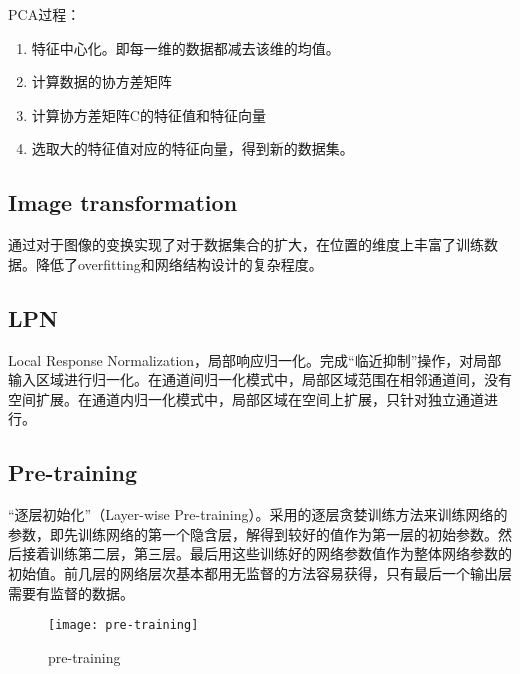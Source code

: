 PCA过程：
\begin{enumerate}
\item 特征中心化。即每一维的数据都减去该维的均值。
\item 计算数据的协方差矩阵
\item 计算协方差矩阵C的特征值和特征向量
\item 选取大的特征值对应的特征向量，得到新的数据集。
\end{enumerate}

\subsection{Image transformation}
通过对于图像的变换实现了对于数据集合的扩大，在位置的维度上丰富了训练数据。降低了overfitting和网络结构设计的复杂程度。

\subsection{LPN}
Local Response Normalization，局部响应归一化。完成``临近抑制''操作，对局部输入区域进行归一化。在通道间归一化模式中，局部区域范围在相邻通道间，没有空间扩展。在通道内归一化模式中，局部区域在空间上扩展，只针对独立通道进行。

\subsection{Pre-training}
``逐层初始化''（Layer-wise Pre-training）。采用的逐层贪婪训练方法来训练网络的参数，即先训练网络的第一个隐含层，解得到较好的值作为第一层的初始参数。然后接着训练第二层，第三层。最后用这些训练好的网络参数值作为整体网络参数的初始值。前几层的网络层次基本都用无监督的方法容易获得，只有最后一个输出层需要有监督的数据。
\begin{figure}[!ht]
\centering
\texttt{[image: pre-training]}
\caption{pre-training}
\end{figure}

